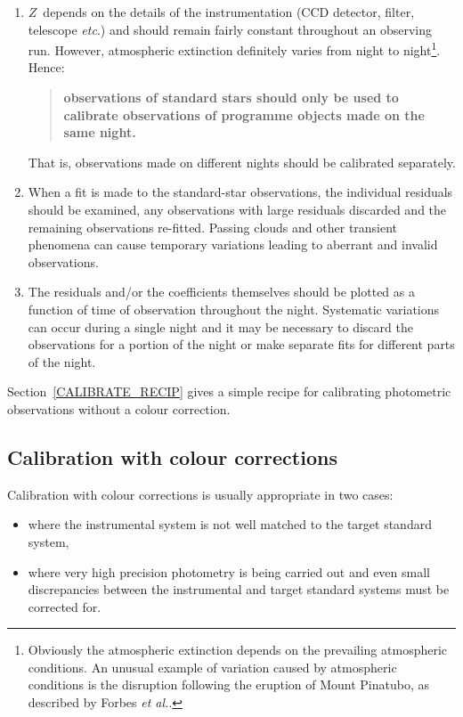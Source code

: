 \documentclass[twoside,11pt]{article}
\begin{document}
\begin{enumerate}

  \item $Z$\, depends on the details of the instrumentation (CCD detector,
   filter, telescope \emph{etc}.) and should remain fairly constant throughout
   an observing run.  However, atmospheric extinction definitely varies
   from night to night\footnote{Obviously the atmospheric extinction
   depends on the prevailing atmospheric conditions.  An unusual example
   of variation caused by atmospheric conditions is the disruption
   following the eruption of Mount Pinatubo, as described by Forbes {\it
   et al.}\/\cite{FORBES95}.}.  Hence:

  \begin{quote}
   {\bf observations of standard stars should only be used to calibrate
   observations of programme objects made on the same night.}
  \end{quote}

   That is, observations made on different nights should be calibrated
   separately.

  \item When a fit is made to the standard-star observations, the
   individual residuals should be examined, any observations with
   large residuals discarded and the remaining observations re-fitted.
   Passing clouds and other transient phenomena can cause temporary
   variations leading to aberrant and invalid observations.

  \item The residuals and/or the coefficients themselves should be
   plotted as a function of time of observation throughout the night.
   Systematic variations can occur during a single night and it may
   be necessary to discard the observations for a portion of the night
   or make separate fits for different parts of the night.

\end{enumerate}

Section~\ref{CALIBRATE_RECIP} gives a simple recipe for calibrating
photometric observations without a colour correction.

\subsection{Calibration with colour corrections}

Calibration with colour corrections is usually appropriate in two
cases:

\begin{itemize}

  \item where the instrumental system is not well matched to the target
   standard system,

  \item where very high precision photometry is being carried out and
   even small discrepancies between the instrumental and target standard
   systems must be corrected for.

\end{itemize}
\end{document}
